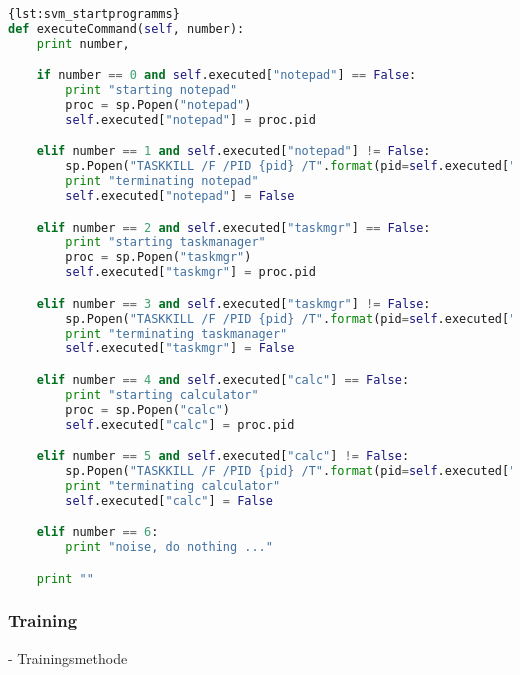 \begin{lstlisting}[language=Python,caption={Start Programms},label={lst:svm_startprogramms}]{lst:svm_startprogramms}
def executeCommand(self, number):
	print number,

	if number == 0 and self.executed["notepad"] == False:
		print "starting notepad"
		proc = sp.Popen("notepad")
		self.executed["notepad"] = proc.pid

	elif number == 1 and self.executed["notepad"] != False:
		sp.Popen("TASKKILL /F /PID {pid} /T".format(pid=self.executed["notepad"]))
		print "terminating notepad"
		self.executed["notepad"] = False

	elif number == 2 and self.executed["taskmgr"] == False:
		print "starting taskmanager"
		proc = sp.Popen("taskmgr")
		self.executed["taskmgr"] = proc.pid

	elif number == 3 and self.executed["taskmgr"] != False:
		sp.Popen("TASKKILL /F /PID {pid} /T".format(pid=self.executed["taskmgr"]))
		print "terminating taskmanager"
		self.executed["taskmgr"] = False

	elif number == 4 and self.executed["calc"] == False:
		print "starting calculator"
		proc = sp.Popen("calc")
		self.executed["calc"] = proc.pid

	elif number == 5 and self.executed["calc"] != False:
		sp.Popen("TASKKILL /F /PID {pid} /T".format(pid=self.executed["calc"]))
		print "terminating calculator"
		self.executed["calc"] = False

	elif number == 6:
		print "noise, do nothing ..."

	print ""
\end{lstlisting}


\subsubsection{Training}
- Trainingsmethode